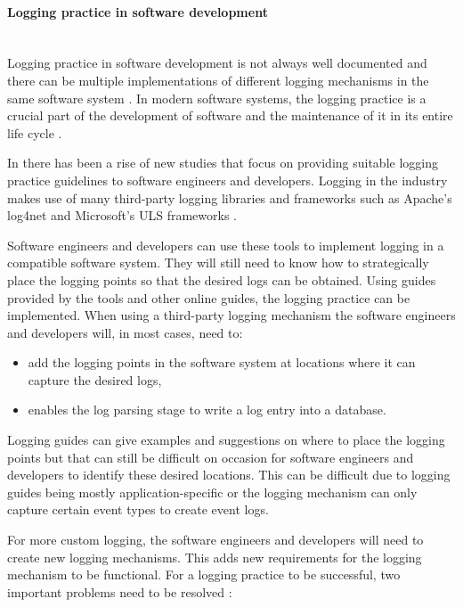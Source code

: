 \paragraph{Logging practice in software development}\label{sec:ch1_loggingPractice}\leavevmode\\
Logging practice in software development is not always well documented and there can be multiple implementations of different logging mechanisms in the same software system \cite{Pecchia2015, Kitchenham2007}. In modern software systems, the logging practice is a crucial part of the development of software and the maintenance of it in its entire life cycle \cite{Rong2018}.\par In  there has been a rise of new studies that focus on providing suitable logging practice guidelines to software engineers and developers. Logging in the industry makes use of many third-party logging libraries and frameworks such as Apache's log4net and Microsoft's ULS frameworks \cite{Zhu2015, Rong2018}.\par Software engineers and developers can use these tools to implement logging in a compatible software system. They will still need to know how to strategically place the logging points so that the desired logs can be obtained. Using guides provided by the tools and other online guides, the logging practice can be implemented. When using a third-party logging mechanism the software engineers and developers will, in most cases, need to:

\begin{itemize}
	\item add the logging points in the software system at locations where it can capture the desired logs,
	\item enables the log parsing stage to write a log entry into a database.
\end{itemize}

Logging guides can give examples and suggestions on where to place the logging points but that can still be difficult on occasion for software engineers and developers to identify these desired locations. This can be difficult due to logging guides being mostly application-specific or the logging mechanism can only capture certain event types to create event logs. \par For more custom logging, the software engineers and developers will need to create new logging mechanisms. This adds new requirements for the logging mechanism to be functional. For a logging practice to be successful, two important problems need to be resolved \cite{Zhu2015, Zhu2019, Rong2018}:

